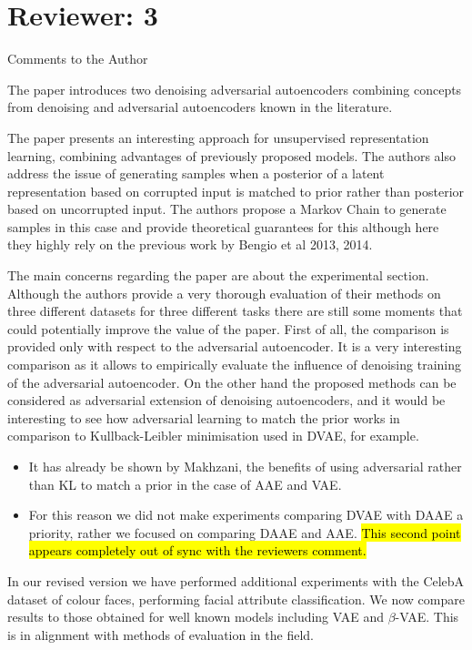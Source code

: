 \documentclass{article}
\begin{document}
\section{Reviewer: 3}

Comments to the Author
{\color{blue}
The paper introduces two denoising adversarial autoencoders combining concepts from denoising and adversarial autoencoders known in the literature. 

The paper presents an interesting approach for unsupervised representation learning, combining advantages of previously proposed models. The authors also address the issue of generating samples when a posterior of a latent representation based on corrupted input is matched to prior rather than posterior based on uncorrupted input. The authors propose a Markov Chain to generate samples in this case and provide theoretical guarantees for this although here they highly rely on the previous work by Bengio et al 2013, 2014. 

The main concerns regarding the paper are about the experimental section. Although the authors provide a very thorough evaluation of their methods on three different datasets for three different tasks there are still some moments that could potentially improve the value of the paper. First of all, the comparison is provided only with respect to the adversarial autoencoder. It is a very interesting comparison as it allows to empirically evaluate the influence of denoising training of the adversarial autoencoder. On the other hand the proposed methods can be considered as adversarial extension of denoising autoencoders, and it would be interesting to see how adversarial learning to match the prior works in comparison to Kullback-Leibler minimisation used in DVAE, for example.}

\begin{itemize}
    \item It has already be shown by Makhzani, the benefits of using adversarial rather than KL to match a prior in the case of AAE and VAE.
    \item For this reason we did not make experiments comparing DVAE with DAAE a priority, rather we focused on comparing DAAE and AAE. \hl{This second point appears completely out of sync with the reviewers comment.}
\end{itemize}

In our revised version we have performed additional experiments with the CelebA dataset of colour faces, performing facial attribute classification. We now compare results to those obtained for well known models including VAE and $\beta$-VAE. This is in alignment with methods of evaluation in the field.
\end{document}
